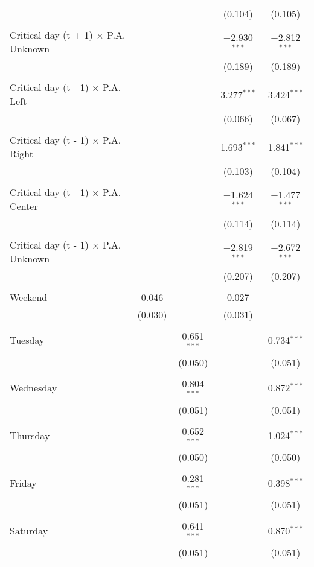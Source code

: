 \documentclass[
]{article}
\begin{document}
\begin{table}[!htbp]
{\begin{tabular}{@{\extracolsep{5pt}}lcccc}
  &  &  & (0.104) & (0.105) \\ 
  & & & & \\ 
 Critical day (t + 1) $\times$ P.A. Unknown &  &  & $-$2.930$^{***}$ & $-$2.812$^{***}$ \\ 
  &  &  & (0.189) & (0.189) \\ 
  & & & & \\ 
 Critical day (t - 1) $\times$ P.A. Left &  &  & 3.277$^{***}$ & 3.424$^{***}$ \\ 
  &  &  & (0.066) & (0.067) \\ 
  & & & & \\ 
 Critical day (t - 1) $\times$ P.A. Right &  &  & 1.693$^{***}$ & 1.841$^{***}$ \\ 
  &  &  & (0.103) & (0.104) \\ 
  & & & & \\ 
 Critical day (t - 1) $\times$ P.A. Center &  &  & $-$1.624$^{***}$ & $-$1.477$^{***}$ \\ 
  &  &  & (0.114) & (0.114) \\ 
  & & & & \\ 
 Critical day (t - 1) $\times$ P.A. Unknown &  &  & $-$2.819$^{***}$ & $-$2.672$^{***}$ \\ 
  &  &  & (0.207) & (0.207) \\ 
  & & & & \\ 
 Weekend & 0.046 &  & 0.027 &  \\ 
  & (0.030) &  & (0.031) &  \\ 
  & & & & \\ 
 Tuesday &  & 0.651$^{***}$ &  & 0.734$^{***}$ \\ 
  &  & (0.050) &  & (0.051) \\ 
  & & & & \\ 
 Wednesday &  & 0.804$^{***}$ &  & 0.872$^{***}$ \\ 
  &  & (0.051) &  & (0.051) \\ 
  & & & & \\ 
 Thursday &  & 0.652$^{***}$ &  & 1.024$^{***}$ \\ 
  &  & (0.050) &  & (0.050) \\ 
  & & & & \\ 
 Friday &  & 0.281$^{***}$ &  & 0.398$^{***}$ \\ 
  &  & (0.051) &  & (0.051) \\ 
  & & & & \\ 
 Saturday &  & 0.641$^{***}$ &  & 0.870$^{***}$ \\ 
  &  & (0.051) &  & (0.051) \\ 

\end{tabular}}
\end{table}
\end{document}

